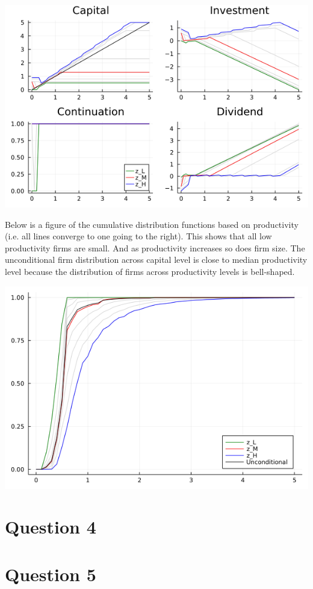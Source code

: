 \documentclass{article}
\begin{document}
\includegraphics[scale = .75]{policy_functions.png}

\pagebreak

Below is a figure of the cumulative distribution functions based on productivity (i.e. all lines converge to one going to the right). This shows that all low productivity firms are small. And as productivity increases so does firm size.  The unconditional firm distribution across capital level is close to median productivity level because the distribution of firms across productivity levels is bell-shaped.

\bigskip

\includegraphics[scale = .5]{cdf.png}

\section*{Question 4}

\section*{Question 5}



\pagebreak
\end{document}
